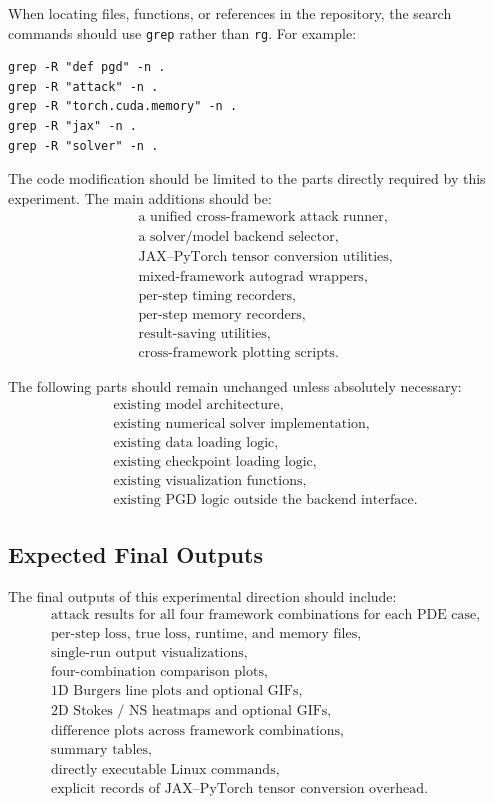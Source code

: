 \documentclass{article}
\begin{document}
When locating files, functions, or references in the repository, the search commands should use \texttt{grep} rather than \texttt{rg}. For example:
\begin{verbatim}
grep -R "def pgd" -n .
grep -R "attack" -n .
grep -R "torch.cuda.memory" -n .
grep -R "jax" -n .
grep -R "solver" -n .
\end{verbatim}

The code modification should be limited to the parts directly required by this experiment. The main additions should be:
\[
\begin{aligned}
&\text{a unified cross-framework attack runner},\\
&\text{a solver/model backend selector},\\
&\text{JAX--PyTorch tensor conversion utilities},\\
&\text{mixed-framework autograd wrappers},\\
&\text{per-step timing recorders},\\
&\text{per-step memory recorders},\\
&\text{result-saving utilities},\\
&\text{cross-framework plotting scripts}.
\end{aligned}
\]

The following parts should remain unchanged unless absolutely necessary:
\[
\begin{aligned}
&\text{existing model architecture},\\
&\text{existing numerical solver implementation},\\
&\text{existing data loading logic},\\
&\text{existing checkpoint loading logic},\\
&\text{existing visualization functions},\\
&\text{existing PGD logic outside the backend interface}.
\end{aligned}
\]

\subsection{Expected Final Outputs}

The final outputs of this experimental direction should include:
\[
\begin{aligned}
&\text{attack results for all four framework combinations for each PDE case},\\
&\text{per-step loss, true loss, runtime, and memory files},\\
&\text{single-run output visualizations},\\
&\text{four-combination comparison plots},\\
&\text{1D Burgers line plots and optional GIFs},\\
&\text{2D Stokes / NS heatmaps and optional GIFs},\\
&\text{difference plots across framework combinations},\\
&\text{summary tables},\\
&\text{directly executable Linux commands},\\
&\text{explicit records of JAX--PyTorch tensor conversion overhead}.
\end{aligned}
\]
\end{document}
